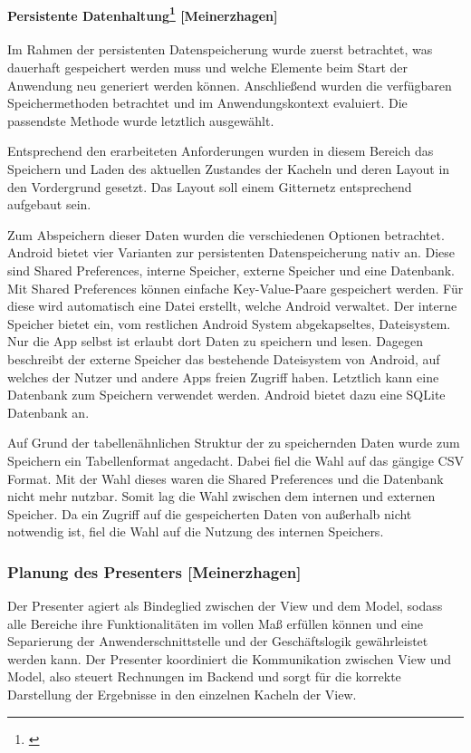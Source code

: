\paragraph{Persistente Datenhaltung\protect\footnote{\cite[vgl.][]{ogbo2016}} [Meinerzhagen]}

Im Rahmen der persistenten Datenspeicherung wurde zuerst betrachtet, was dauerhaft gespeichert werden muss und welche Elemente beim Start der Anwendung neu generiert werden können. Anschließend wurden die verfügbaren Speichermethoden betrachtet und im Anwendungskontext evaluiert. Die passendste Methode wurde letztlich ausgewählt.

Entsprechend den erarbeiteten Anforderungen wurden in diesem Bereich das Speichern und Laden des aktuellen Zustandes der Kacheln und deren Layout in den Vordergrund gesetzt. Das Layout soll einem Gitternetz entsprechend aufgebaut sein.

Zum Abspeichern dieser Daten wurden die verschiedenen Optionen betrachtet. Android bietet vier Varianten zur persistenten Datenspeicherung nativ an. Diese sind Shared Preferences, interne Speicher, externe Speicher und eine Datenbank. Mit Shared Preferences können einfache Key-Value-Paare gespeichert werden. Für diese wird automatisch eine Datei erstellt, welche Android verwaltet. Der interne Speicher bietet ein, vom restlichen Android System abgekapseltes, Dateisystem. Nur die App selbst ist erlaubt dort Daten zu speichern und lesen. Dagegen beschreibt der externe Speicher das bestehende Dateisystem von Android, auf welches der Nutzer und andere Apps freien Zugriff haben. Letztlich kann eine Datenbank zum Speichern verwendet werden. Android bietet dazu eine SQLite Datenbank an.

Auf Grund der tabellenähnlichen Struktur der zu speichernden Daten wurde zum Speichern ein Tabellenformat angedacht. Dabei fiel die Wahl auf das gängige CSV Format. Mit der Wahl dieses waren die Shared Preferences und die Datenbank nicht mehr nutzbar. Somit lag die Wahl zwischen dem internen und externen Speicher. Da ein Zugriff auf die gespeicherten Daten von außerhalb nicht notwendig ist, fiel die Wahl auf die Nutzung des internen Speichers. 

\clearpage

\subsubsection{Planung des Presenters [Meinerzhagen]}
Der Presenter agiert als Bindeglied zwischen der View und dem Model, sodass alle Bereiche ihre Funktionalitäten im vollen Maß erfüllen können und eine Separierung der Anwenderschnittstelle und der Geschäftslogik gewährleistet werden kann. Der Presenter koordiniert die Kommunikation zwischen View und Model, also steuert Rechnungen im Backend und sorgt für die korrekte Darstellung der Ergebnisse in den einzelnen Kacheln der View.

